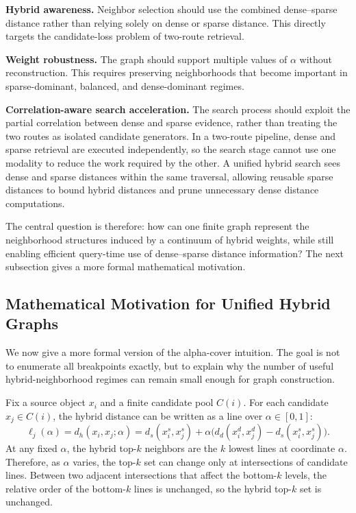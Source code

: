 \textbf{Hybrid awareness.} Neighbor selection should use the combined dense--sparse distance rather than relying solely on dense or sparse distance. This directly targets the candidate-loss problem of two-route retrieval.

\textbf{Weight robustness.} The graph should support multiple values of $\alpha$ without reconstruction. This requires preserving neighborhoods that become important in sparse-dominant, balanced, and dense-dominant regimes.

\textbf{Correlation-aware search acceleration.} The search process should exploit the partial correlation between dense and sparse evidence, rather than treating the two routes as isolated candidate generators. In a two-route pipeline, dense and sparse retrieval are executed independently, so the search stage cannot use one modality to reduce the work required by the other. A unified hybrid search sees dense and sparse distances within the same traversal, allowing reusable sparse distances to bound hybrid distances and prune unnecessary dense distance computations.

The central question is therefore: how can one finite graph represent the neighborhood structures induced by a continuum of hybrid weights, while still enabling efficient query-time use of dense--sparse distance information? The next subsection gives a more formal mathematical motivation.

\subsection{Mathematical Motivation for Unified Hybrid Graphs}

We now give a more formal version of the alpha-cover intuition. The goal is not to enumerate all breakpoints exactly, but to explain why the number of useful hybrid-neighborhood regimes can remain small enough for graph construction.

Fix a source object $x_i$ and a finite candidate pool $C(i)$. For each candidate $x_j\in C(i)$, the hybrid distance can be written as a line over $\alpha\in[0,1]$:
\begin{equation}
    \ell_j(\alpha)
    =d_h(x_i,x_j;\alpha)
    =d_s(x_i^s,x_j^s)
    +\alpha\big(d_d(x_i^d,x_j^d)-d_s(x_i^s,x_j^s)\big).
    \label{eq:rigorous-alpha-line}
\end{equation}
At any fixed $\alpha$, the hybrid top-$k$ neighbors are the $k$ lowest lines at coordinate $\alpha$. Therefore, as $\alpha$ varies, the top-$k$ set can change only at intersections of candidate lines. Between two adjacent intersections that affect the bottom-$k$ levels, the relative order of the bottom-$k$ lines is unchanged, so the hybrid top-$k$ set is unchanged.

